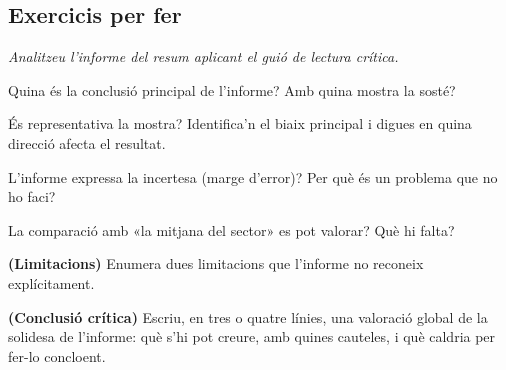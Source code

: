 \subsection{Exercicis per fer}

\noindent\textit{Analitzeu l'informe del resum aplicant el guió de lectura crítica.}

\begin{exercicis}
\begin{exlist}
  \item Quina és la conclusió principal de l'informe? Amb quina mostra la sosté?
  \item És representativa la mostra? Identifica'n el biaix principal i digues en quina
        direcció afecta el resultat.
  \item L'informe expressa la incertesa (marge d'error)? Per què és un problema que no ho
        faci?
  \item La comparació amb «la mitjana del sector» es pot valorar? Què hi falta?
  \item \textbf{(Limitacions)} Enumera dues limitacions que l'informe no reconeix
        explícitament.
  \item \textbf{(Conclusió crítica)} Escriu, en tres o quatre línies, una valoració
        global de la solidesa de l'informe: què s'hi pot creure, amb quines cauteles, i què
        caldria per fer-lo concloent.
\end{exlist}
\end{exercicis}

